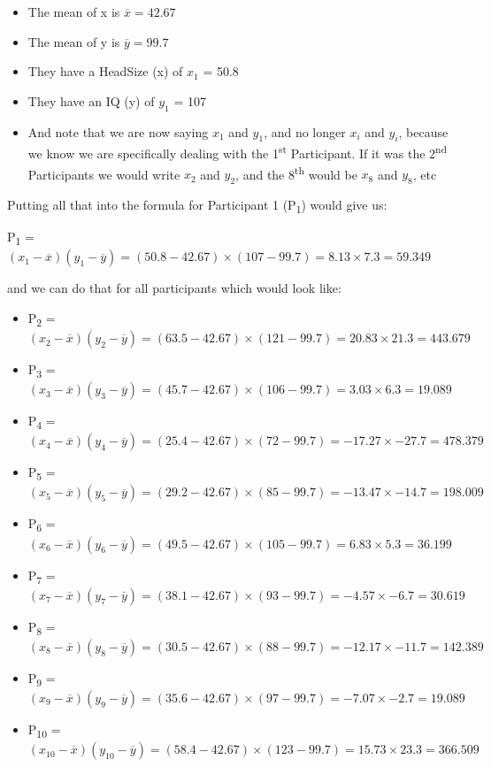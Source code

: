 \documentclass[
  oneside]{book}
\providecommand{\tightlist}{%
  \setlength{\itemsep}{0pt}\setlength{\parskip}{0pt}}
\begin{document}
\begin{itemize}
\tightlist
\item
  The mean of x is \(\overline{x} = 42.67\)
\item
  The mean of y is \(\overline{y} = 99.7\)
\item
  They have a HeadSize (x) of \(x_1\) = 50.8
\item
  They have an IQ (y) of \(y_1\) = 107
\item
  And note that we are now saying \(x_1\) and \(y_1\), and no longer \(x_i\) and \(y_i\), because we know we are specifically dealing with the 1\textsuperscript{st} Participant. If it was the 2\textsuperscript{nd} Participants we would write \(x_2\) and \(y_2\), and the 8\textsuperscript{th} would be \(x_8\) and \(y_8\), etc
\end{itemize}

Putting all that into the formula for Participant 1 (P\textsubscript{1}) would give us:

P\textsubscript{1} = \((x_1 - \overline{x})(y_1 - \overline{y}) = (50.8 - 42.67)\times(107 - 99.7) = 8.13 \times 7.3 = 59.349\)

and we can do that for all participants which would look like:

\begin{itemize}
\tightlist
\item
  P\textsubscript{2} = \((x_2 - \overline{x})(y_2 - \overline{y}) = (63.5 - 42.67)\times(121 - 99.7) = 20.83\times21.3 = 443.679\)
\item
  P\textsubscript{3} = \((x_3 - \overline{x})(y_3 - \overline{y}) = (45.7 - 42.67)\times(106 - 99.7) = 3.03\times6.3 = 19.089\)
\item
  P\textsubscript{4} = \((x_4 - \overline{x})(y_4 - \overline{y}) = (25.4 - 42.67)\times(72 - 99.7) = -17.27\times-27.7 = 478.379\)
\item
  P\textsubscript{5} = \((x_5 - \overline{x})(y_5 - \overline{y}) = (29.2 - 42.67)\times(85 - 99.7) = -13.47\times-14.7 = 198.009\)
\item
  P\textsubscript{6} = \((x_6 - \overline{x})(y_6 - \overline{y}) = (49.5 - 42.67)\times(105 - 99.7) = 6.83\times5.3 = 36.199\)
\item
  P\textsubscript{7} = \((x_7 - \overline{x})(y_7 - \overline{y}) = (38.1 - 42.67)\times(93 - 99.7) = -4.57\times-6.7 = 30.619\)
\item
  P\textsubscript{8} = \((x_8 - \overline{x})(y_8 - \overline{y}) = (30.5 - 42.67)\times(88 - 99.7) = -12.17\times-11.7 = 142.389\)
\item
  P\textsubscript{9} = \((x_9 - \overline{x})(y_9 - \overline{y}) = (35.6 - 42.67)\times(97 - 99.7) = -7.07\times-2.7 = 19.089\)
\item
  P\textsubscript{10} = \((x_10 - \overline{x})(y_10 - \overline{y}) = (58.4 - 42.67)\times(123 - 99.7) = 15.73\times23.3 = 366.509\)
\end{itemize}
\end{document}
